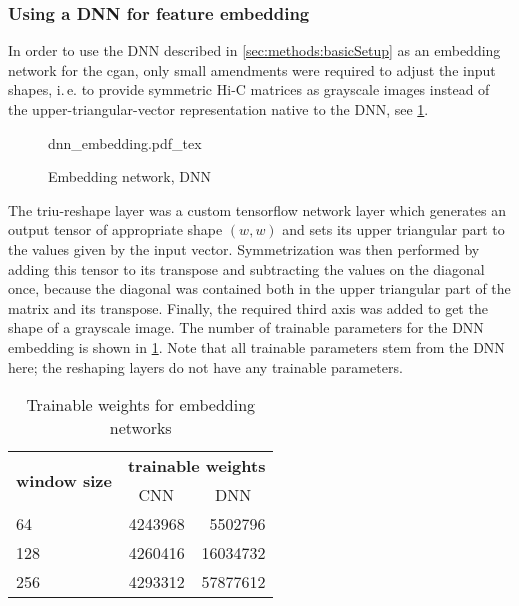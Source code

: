 \subsubsection{Using a DNN for feature embedding} \label{sec:methods:dnn-embedding}
In order to use the DNN described in \cref{sec:methods:basicSetup} as an embedding network
for the \acrshort{cgan}, only small amendments were required to adjust the input shapes,
i.\,e. to provide symmetric Hi-C matrices as grayscale images instead of the upper-triangular-vector representation
native to the DNN, see \cref{fig:methods:dnn-embedding}.
\begin{figure}[p]
    \scriptsize
    \centering
    {dnn_embedding.pdf_tex}
    \caption{Embedding network, DNN} \label{fig:methods:dnn-embedding}
\end{figure}
The triu-reshape layer was a custom tensorflow network layer which generates an output tensor
of appropriate shape $(w,w)$ and sets its upper triangular part to the values given by the input vector.
Symmetrization was then performed by adding this tensor to its transpose and subtracting the values on the diagonal once,
because the diagonal was contained both in the upper triangular part of the matrix and its transpose.
Finally, the required third axis was added to get the shape of a grayscale image.
The number of trainable parameters for the DNN embedding is shown in \cref{tab:methods:embedding_network_params}.
Note that all trainable parameters stem from the DNN here; the reshaping layers do not have any trainable parameters.
\begin{table}[htbp]
\centering
\begin{tabular}{lrr}
\hline
\multicolumn{1}{c}{\multirow{2}{*}{\textbf{window size}}} & \multicolumn{2}{c}{\textbf{trainable weights}}    \\
\multicolumn{1}{c}{}                                     & \multicolumn{1}{c}{CNN} & \multicolumn{1}{c}{DNN} \\ \hline
64                                                       & 4243968                 & 5502796                 \\
128                                                      & 4260416                 & 16034732                \\
256                                                      & 4293312                 & 57877612                \\ \hline
\end{tabular}
\caption{Trainable weights for embedding networks}\label{tab:methods:embedding_network_params}
\end{table}


